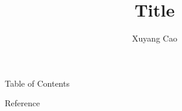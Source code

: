 \documentclass[t,11pt]{beamer}
\title{Title}
\author{Xuyang Cao}
\date{}
\begin{document}
\frame{\titlepage}                  


\begin{frame}{Table of Contents}           %
    \setcounter{tocdepth}{1}               %
    \tableofcontents                       %
\end{frame}

 

\begin{frame}{Reference}
    
    \small
\end{frame}
\end{document}
